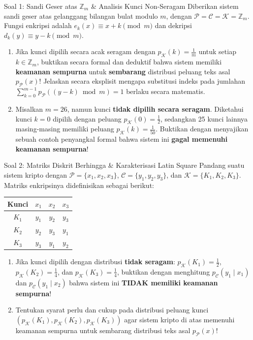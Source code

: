 \documentclass[11pt,a4paper]{article}
\begin{document}
\begin{soalbox}{Soal 1: Sandi Geser atas $\mathbb{Z}_m$ \& Analisis Kunci Non-Seragam}
Diberikan sistem sandi geser atas gelanggang bilangan bulat modulo $m$, dengan $\mathcal{P} = \mathcal{C} = \mathcal{K} = \mathbb{Z}_m$. Fungsi enkripsi adalah $e_k(x) \equiv x + k \pmod m$ dan dekripsi $d_k(y) \equiv y - k \pmod m$.
\begin{enumerate}[label=(\alph*)]
    \item Jika kunci dipilih secara acak seragam dengan $p_{\mathcal{K}}(k) = \frac{1}{m}$ untuk setiap $k \in \mathbb{Z}_m$, buktikan secara formal dan deduktif bahwa sistem memiliki \textbf{keamanan sempurna} untuk \textbf{sembarang} distribusi peluang teks asal $p_{\mathcal{P}}(x)$! Jelaskan secara eksplisit mengapa substitusi indeks pada jumlahan $\sum_{k=0}^{m-1} p_{\mathcal{P}}((y-k)\bmod m) = 1$ berlaku secara matematis.
    \item Misalkan $m = 26$, namun kunci \textbf{tidak dipilih secara seragam}. Diketahui kunci $k = 0$ dipilih dengan peluang $p_{\mathcal{K}}(0) = \frac{1}{2}$, sedangkan 25 kunci lainnya masing-masing memiliki peluang $p_{\mathcal{K}}(k) = \frac{1}{50}$. Buktikan dengan menyajikan sebuah contoh penyangkal formal bahwa sistem ini \textbf{gagal memenuhi keamanan sempurna}!
\end{enumerate}
\end{soalbox}

\vspace{0.4cm}

\begin{soalbox}{Soal 2: Matriks Diskrit Berhingga \& Karakterisasi Latin Square}
Pandang suatu sistem kripto dengan $\mathcal{P} = \{x_1, x_2, x_3\}$, $\mathcal{C} = \{y_1, y_2, y_3\}$, dan $\mathcal{K} = \{K_1, K_2, K_3\}$. Matriks enkripsinya didefinisikan sebagai berikut:
\begin{center}
\begin{tabular}{c|ccc}
\toprule
Kunci & $x_1$ & $x_2$ & $x_3$ \\
\midrule
$K_1$ & $y_1$ & $y_2$ & $y_3$ \\
$K_2$ & $y_2$ & $y_3$ & $y_1$ \\
$K_3$ & $y_3$ & $y_1$ & $y_2$ \\
\bottomrule
\end{tabular}
\end{center}
\begin{enumerate}[label=(\alph*)]
    \item Jika kunci dipilih dengan distribusi \textbf{tidak seragam}: $p_{\mathcal{K}}(K_1) = \frac{1}{2}$, $p_{\mathcal{K}}(K_2) = \frac{1}{4}$, dan $p_{\mathcal{K}}(K_3) = \frac{1}{4}$, buktikan dengan menghitung $p_{\mathcal{C}}(y_1 \mid x_1)$ dan $p_{\mathcal{C}}(y_1 \mid x_2)$ bahwa sistem ini \textbf{TIDAK memiliki keamanan sempurna}!
    \item Tentukan syarat perlu dan cukup pada distribusi peluang kunci $(p_{\mathcal{K}}(K_1), p_{\mathcal{K}}(K_2), p_{\mathcal{K}}(K_3))$ agar sistem kripto di atas memenuhi keamanan sempurna untuk sembarang distribusi teks asal $p_{\mathcal{P}}(x)$!
\end{enumerate}
\end{soalbox}
\end{document}
